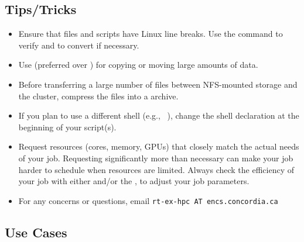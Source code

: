 \documentclass{easychair}
\begin{document}
\subsection{Tips/Tricks}
\label{sect:tips}

\begin{itemize}
	\item
	Ensure that files and scripts have Linux line breaks.
	Use the  command to verify and  to convert if necessary.

	\item
	Use  (preferred over ) for copying or moving large amounts of data.
	
	\item
	Before transferring a large number of files between NFS-mounted storage and 
	the cluster, compress the files into a  archive.

	\item
	If you plan to use a different shell (e.g., ~\cite{aosa-book-vol1-bash}), 
	change the shell declaration at the beginning of your script(s).

	\item
	Request resources (cores, memory, GPUs) that closely match the actual needs of your job.
	Requesting significantly more than necessary can make your job harder to schedule when
	resources are limited. Always check the efficiency of your job with either 
	and/or the , to adjust your job parameters.

	\item
	For any concerns or questions, email \texttt{rt-ex-hpc AT encs.concordia.ca}
\end{itemize}

\subsection{Use Cases}
\label{sect:cases}
\end{document}

